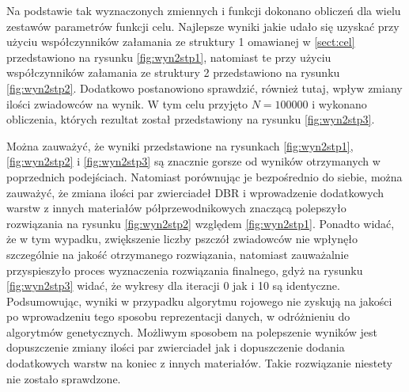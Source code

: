 Na podstawie tak wyznaczonych zmiennych i funkcji dokonano obliczeń dla wielu zestawów parametrów funkcji celu. Najlepsze wyniki jakie udało się uzyskać przy użyciu współczynników załamania ze struktury 1 omawianej w \ref{sect:cel} przedstawiono na rysunku \ref{fig:wyn2stp1}, natomiast te przy użyciu współczynników załamania ze struktury 2 przedstawiono na rysunku \ref{fig:wyn2stp2}. Dodatkowo postanowiono sprawdzić, również tutaj, wpływ zmiany ilości zwiadowców na wynik. W tym celu przyjęto $N=100000$ i wykonano obliczenia, których rezultat został przedstawiony na rysunku \ref{fig:wyn2stp3}.

Można zauważyć, że wyniki przedstawione na rysunkach \ref{fig:wyn2stp1}, \ref{fig:wyn2stp2} i \ref{fig:wyn2stp3} są znacznie gorsze od wyników otrzymanych w poprzednich podejściach. Natomiast porównując je bezpośrednio do siebie, można zauważyć, że zmiana ilości par zwierciadeł DBR i wprowadzenie dodatkowych warstw z innych materiałów półprzewodnikowych znaczącą polepszyło rozwiązania na rysunku \ref{fig:wyn2stp2} względem \ref{fig:wyn2stp1}. Ponadto widać, że w tym wypadku, zwiększenie liczby pszczół zwiadowców nie wpłynęło szczególnie na jakość otrzymanego rozwiązania, natomiast zauważalnie przyspieszyło proces wyznaczenia rozwiązania finalnego, gdyż na rysunku \ref{fig:wyn2stp3} widać, że wykresy dla iteracji 0 jak i 10 są identyczne. Podsumowując, wyniki w przypadku algorytmu rojowego nie zyskują na jakości po wprowadzeniu tego sposobu reprezentacji danych, w odróżnieniu do algorytmów genetycznych. Możliwym sposobem na polepszenie wyników jest dopuszczenie zmiany ilości par zwierciadeł jak i dopuszczenie dodania dodatkowych warstw na koniec z innych materiałów. Takie rozwiązanie niestety nie zostało sprawdzone.

